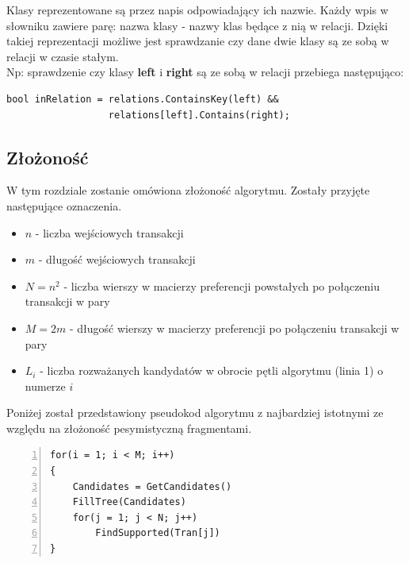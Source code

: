\documentclass[a4paper,12pt]{article}
\begin{document}
Klasy reprezentowane są przez napis odpowiadający ich nazwie. Każdy wpis w słowniku zawiere parę: nazwa klasy - nazwy klas będące z nią w relacji. Dzięki takiej reprezentacji możliwe jest sprawdzanie czy dane dwie klasy są ze sobą w relacji w czasie stałym. \\

Np: sprawdzenie czy klasy {\bf left} i {\bf right} są ze sobą w relacji przebiega następująco:
\begin{center}
\begin{lstlisting}
bool inRelation = relations.ContainsKey(left) && 
				  relations[left].Contains(right);
\end{lstlisting}
\end{center}

\subsection{Złożoność}
W tym rozdziale zostanie omówiona złożoność algorytmu. Zostały przyjęte następujące oznaczenia.
\begin{itemize}
\item $ n$ - liczba wejściowych transakcji
\item $ m$ - długość wejściowych transakcji
\item $ N = n^2$ - liczba wierszy w macierzy preferencji powstałych po połączeniu transakcji w pary
\item $ M = 2m$ - długość wierszy w macierzy preferencji po połączeniu transakcji w pary
\item $ L_i$ - liczba rozważanych kandydatów w obrocie pętli algorytmu (linia 1) o numerze $i$
\end{itemize}
Poniżej został przedstawiony pseudokod algorytmu z najbardziej istotnymi ze względu na złożoność pesymistyczną fragmentami.

\begin{center}
\begin{lstlisting}[numbers=left]
for(i = 1; i < M; i++)
{
	Candidates = GetCandidates()
	FillTree(Candidates)
	for(j = 1; j < N; j++)
		FindSupported(Tran[j])
}
\end{lstlisting}
\end{center}
\end{document}
